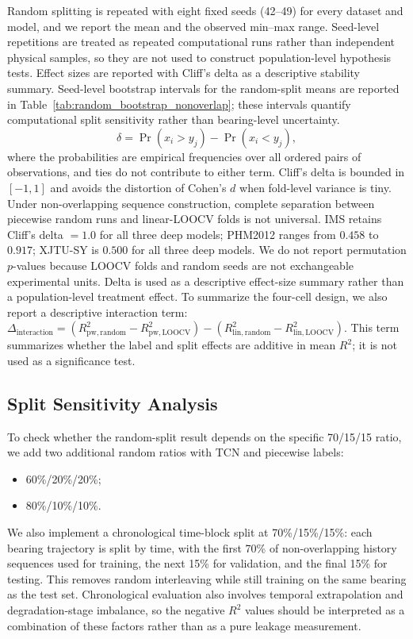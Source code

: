 \documentclass[pdflatex,sn-basic,NameDate]{sn-jnl}
\begin{document}
Random splitting is repeated with eight fixed seeds (42--49) for every dataset and model, and we report the mean and the observed min--max range. Seed-level repetitions are treated as repeated computational runs rather than independent physical samples, so they are not used to construct population-level hypothesis tests. Effect sizes are reported with Cliff's delta as a descriptive stability summary. Seed-level bootstrap intervals for the random-split means are reported in Table~\ref{tab:random_bootstrap_nonoverlap}; these intervals quantify computational split sensitivity rather than bearing-level uncertainty.
\begin{equation}
\delta = \Pr(x_i > y_j) - \Pr(x_i < y_j),
\label{eq:cliff}
\end{equation}
where the probabilities are empirical frequencies over all ordered pairs of observations, and ties do not contribute to either term. Cliff's delta is bounded in $[-1, 1]$ and avoids the distortion of Cohen's $d$ when fold-level variance is tiny. Under non-overlapping sequence construction, complete separation between piecewise random runs and linear-LOOCV folds is not universal. IMS retains Cliff's delta $=1.0$ for all three deep models; PHM2012 ranges from $0.458$ to $0.917$; XJTU-SY is $0.500$ for all three deep models. We do not report permutation $p$-values because LOOCV folds and random seeds are not exchangeable experimental units. Delta is used as a descriptive effect-size summary rather than a population-level treatment effect. To summarize the four-cell design, we also report a descriptive interaction term: $\Delta_{\mathrm{interaction}} = (R^2_{\mathrm{pw,random}} - R^2_{\mathrm{pw,LOOCV}}) - (R^2_{\mathrm{lin,random}} - R^2_{\mathrm{lin,LOOCV}})$. This term summarizes whether the label and split effects are additive in mean $R^2$; it is not used as a significance test.

\subsection{Split Sensitivity Analysis}
To check whether the random-split result depends on the specific 70/15/15 ratio, we add two additional random ratios with TCN and piecewise labels:
\begin{itemize}
    \item 60\%/20\%/20\%;
    \item 80\%/10\%/10\%.
\end{itemize}
We also implement a chronological time-block split at 70\%/15\%/15\%: each bearing trajectory is split by time, with the first 70\% of non-overlapping history sequences used for training, the next 15\% for validation, and the final 15\% for testing. This removes random interleaving while still training on the same bearing as the test set. Chronological evaluation also involves temporal extrapolation and degradation-stage imbalance, so the negative $R^2$ values should be interpreted as a combination of these factors rather than as a pure leakage measurement.
\end{document}
